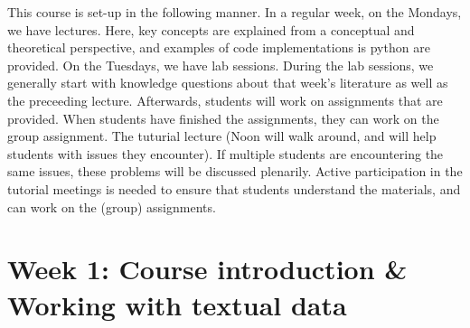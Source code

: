 This course is set-up in the following manner. In a regular week, on the Mondays, we have lectures. Here, key concepts are explained from a conceptual and theoretical perspective, and examples of code implementations is python are provided.  On the Tuesdays, we have lab sessions. During the lab sessions, we generally start with knowledge questions about that week's literature as well as the preceeding lecture. Afterwards, students will work on assignments that are provided. When students have finished the assignments, they can work on the group assignment. The tuturial lecture (Noon will walk around, and will help students with issues they encounter). If multiple students are encountering the same issues, these problems will be discussed plenarily. Active participation in the tutorial meetings is needed to ensure that students understand the materials, and can work on the (group) assignments.

\section*{Week 1: Course introduction \& Working with textual data}

